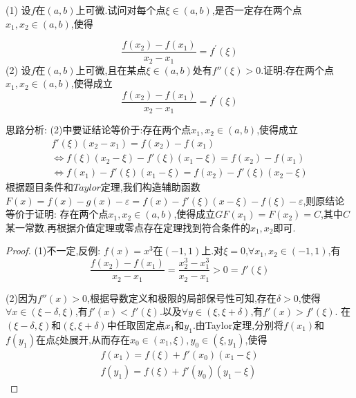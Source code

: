 \documentclass[lang=cn,newtx,10pt,scheme=chinese]{elegantbook}
\begin{document}
\begin{exercise}
(1) 设\(f\)在\((a,b)\)上可微.试问对每个点\(\xi\in(a,b)\),是否一定存在两个点\(x_1,x_2\in(a,b)\),使得

\begin{equation}
\frac{f(x_2)-f(x_1)}{x_2 - x_1}=f^{\prime}(\xi)
\nonumber
\end{equation}
(2) 设\(f\)在\((a,b)\)上可微,且在某点\(\xi\in(a,b)\)处有\(f''(\xi)>0\).证明:存在两个点\(x_1,x_2\in(a,b)\),使得成立
\begin{equation}
    \frac{f(x_2)-f(x_1)}{x_2 - x_1}=f^{\prime}(\xi)
    \nonumber
\end{equation}
\begin{note}
    思路分析:
    (2)中要证结论等价于:存在两个点\(x_1,x_2\in(a,b)\),使得成立
    \begin{gather}
         f'(\xi)(x_2-x_1)=f(x_2)-f(x_1)\nonumber
         \\
         \Leftrightarrow f(\xi)(x_2-\xi)-f'(\xi)(x_1-\xi)=f(x_2)-f(x_1)
         \nonumber
         \\
         \Leftrightarrow f(x_1)-f'(\xi)(x_1-\xi)=f(x_2)-f'(\xi)(x_2-\xi)\nonumber
    \end{gather}
    根据题目条件和$Taylor$定理,我们构造辅助函数$F(x)=f(x)-g(x)-\varepsilon=f(x)-f'(\xi)(x-\xi)-f(\xi)-\varepsilon$,则原结论等价于证明:
    存在两个点\(x_1,x_2\in(a,b)\),使得成立$GF(x_1)=F(x_2)=C$,其中$C$某一常数.再根据介值定理或零点存在定理找到符合条件的$x_1,x_2$即可.
\end{note}
    \begin{proof}
        (1)不一定,反例:
        $f(x)=x^3$在$(-1,1)上$.对$\xi=0$,$\forall x_1,x_2\in(-1,1)$,有
        \begin{equation}
        \frac{f(x_2)-f(x_1)}{x_2-x_1}=\frac{x^3_2-x^3_1}{x_2-x_1}>0=f'(\xi)
            \nonumber
        \end{equation}
    
    (2)因为$f''(x)>0$,根据导数定义和极限的局部保号性可知,存在$\delta>0$,使得$\forall x\in(\xi-\delta,\xi)$,有$f'(x)<f'(\xi)$.以及$\forall y\in(\xi,\xi+\delta)$,有$f'(x)>f'(\xi)$.
    在$(\xi-\delta,\xi)$和$(\xi,\xi+\delta)$中任取固定点$x_1$和$y_1$.由Taylor定理,分别将$f(x_1)$和$f(y_1)$在点$\xi$处展开,从而存在$x_0\in(x_1,\xi), y_0\in(\xi,y_1)$,使得
    \begin{gather}
        f(x_1) = f(\xi) + f'(x_0)(x_1 - \xi) \nonumber\\
        f(y_1) = f(\xi) + f'(y_0)(y_1 - \xi) \nonumber
    \end{gather}
    

\end{proof}
\end{exercise}
\end{document}
